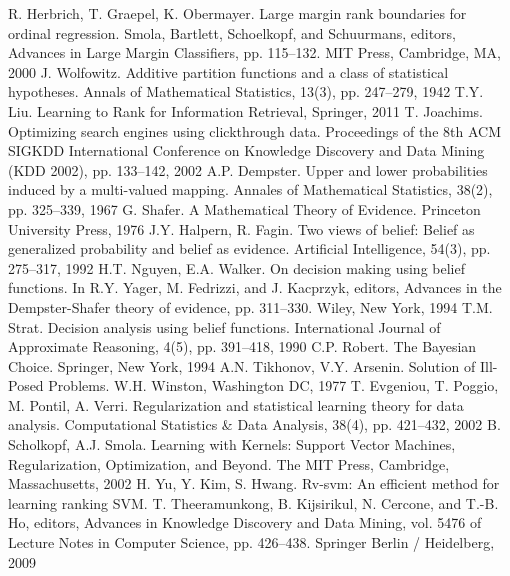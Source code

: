 \documentclass[12pt,a4paper,oneside]{article}
\begin{document}

\begin{thebibliography}{9}
	 R. Herbrich, T. Graepel, K. Obermayer. Large margin rank boundaries for ordinal regression. Smola, Bartlett, Schoelkopf, and Schuurmans, editors, Advances in Large Margin Classifiers, pp. 115–132. MIT Press, Cambridge, MA, 2000%
	 J. Wolfowitz. Additive partition functions and a class of statistical hypotheses. Annals of Mathematical Statistics, 13(3), pp. 247–279, 1942%
	 T.Y. Liu. Learning to Rank for Information Retrieval, Springer, 2011%
	 T. Joachims. Optimizing search engines using clickthrough data. Proceedings of the 8th ACM SIGKDD International Conference on Knowledge Discovery and Data Mining (KDD 2002), pp. 133–142, 2002%
	 A.P. Dempster. Upper and lower probabilities induced by a multi-valued mapping. Annales of Mathematical Statistics, 38(2), pp. 325–339, 1967%
	 G. Shafer. A Mathematical Theory of Evidence. Princeton University Press, 1976%
	 J.Y. Halpern, R. Fagin. Two views of belief: Belief as generalized probability and belief as evidence. Artificial Intelligence, 54(3), pp. 275–317, 1992%
	 H.T. Nguyen,  E.A. Walker. On decision making using belief functions. In R.Y. Yager, M. Fedrizzi, and J. Kacprzyk, editors, Advances in the Dempster-Shafer theory of evidence, pp. 311–330. Wiley, New York, 1994%
	 T.M. Strat. Decision analysis using belief functions. International Journal of Approximate Reasoning, 4(5), pp. 391–418, 1990%
	 C.P. Robert. The Bayesian Choice. Springer, New York, 1994%
	 A.N. Tikhonov, V.Y. Arsenin. Solution of Ill-Posed Problems. W.H. Winston, Washington DC, 1977%
	 T. Evgeniou, T. Poggio, M. Pontil, A. Verri. Regularization and statistical learning theory for data analysis. Computational Statistics \& Data Analysis, 38(4), pp. 421–432, 2002%
	 B. Scholkopf, A.J. Smola. Learning with Kernels: Support Vector Machines, Regularization, Optimization, and Beyond. The MIT Press, Cambridge, Massachusetts, 2002%
	 H. Yu, Y. Kim, S. Hwang. Rv-svm: An efficient method for learning ranking SVM. T. Theeramunkong, B. Kijsirikul, N. Cercone, and T.-B. Ho, editors, Advances in Knowledge Discovery and Data Mining, vol. 5476 of Lecture Notes in Computer Science, pp. 426–438. Springer Berlin / Heidelberg, 2009%
\end{thebibliography}
\end{document}
